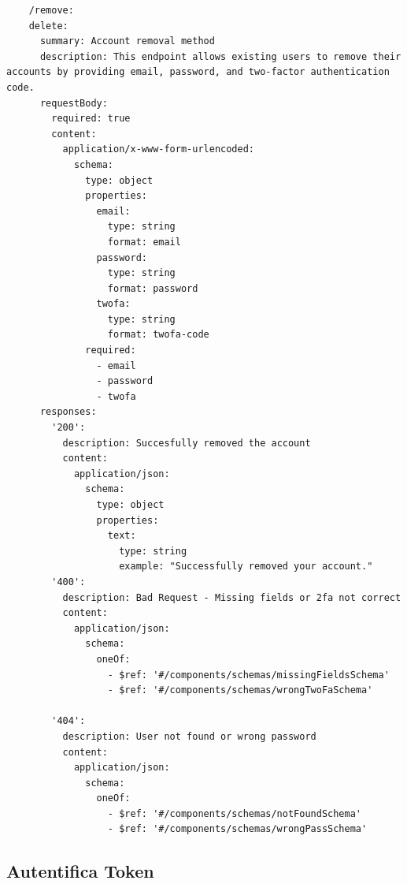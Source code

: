\documentclass{report}
\begin{document}
\begin{verbatim}
	/remove:
    delete:
      summary: Account removal method
      description: This endpoint allows existing users to remove their accounts by providing email, password, and two-factor authentication code.
      requestBody:
        required: true
        content:
          application/x-www-form-urlencoded:
            schema:
              type: object
              properties:
                email:
                  type: string
                  format: email
                password:
                  type: string
                  format: password
                twofa:
                  type: string
                  format: twofa-code
              required:
                - email
                - password
                - twofa
      responses:
        '200':
          description: Succesfully removed the account
          content:
            application/json:
              schema:
                type: object
                properties:
                  text:
                    type: string
                    example: "Successfully removed your account."
        '400':
          description: Bad Request - Missing fields or 2fa not correct
          content:
            application/json:
              schema:
                oneOf:
                  - $ref: '#/components/schemas/missingFieldsSchema'
                  - $ref: '#/components/schemas/wrongTwoFaSchema'
      
        '404':
          description: User not found or wrong password
          content:
            application/json:
              schema:
                oneOf:
                  - $ref: '#/components/schemas/notFoundSchema'
                  - $ref: '#/components/schemas/wrongPassSchema'

\end{verbatim}
\subsection{Autentifica Token}
\end{document}

